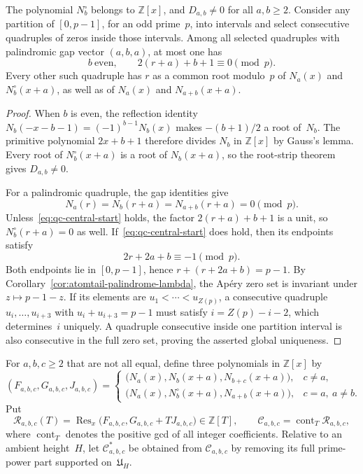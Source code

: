\begin{lemma}\label{lem:qc-deflation}
The polynomial $N_b^\circ$ belongs to $\mathbb Z[x]$, and
$D_{a,b}\ne0$ for all $a,b\ge2$.  Consider any partition of
$[0,p-1]$, for an odd prime~$p$, into intervals and select
consecutive quadruples of zeros
inside those intervals.  Among all selected quadruples with
palindromic gap vector $(a,b,a)$, at most one has
\begin{equation}\label{eq:qc-central-start}
 b\ \text{even},\qquad 2(r+a)+b+1\equiv0\pmod p.
\end{equation}
Every other such quadruple has $r$ as a common root modulo~$p$ of
$N_a(x)$ and $N_b^\circ(x+a)$, as well as of $N_a(x)$ and
$N_{a+b}(x+a)$.
\end{lemma}

\begin{proof}
When $b$ is even, the reflection identity
$N_b(-x-b-1)=(-1)^{b-1}N_b(x)$ makes
$-(b+1)/2$ a root of~$N_b$.  The primitive polynomial
$2x+b+1$ therefore divides $N_b$ in $\mathbb Z[x]$ by Gauss's
lemma.  Every root of $N_b^\circ(x+a)$ is a root of
$N_b(x+a)$, so the root-strip theorem gives $D_{a,b}\ne0$.

For a palindromic quadruple, the gap identities give
\[
 N_a(r)=N_b(r+a)=N_{a+b}(r+a)=0\pmod p.
\]
Unless~\eqref{eq:qc-central-start} holds, the factor
$2(r+a)+b+1$ is a unit, so $N_b^\circ(r+a)=0$ as well.
If~\eqref{eq:qc-central-start} does hold, then its endpoints satisfy
\[
 2r+2a+b\equiv-1\pmod p.
\]
Both endpoints lie in $[0,p-1]$, hence
$r+(r+2a+b)=p-1$.  By
Corollary~\ref{cor:atomtail-palindrome-lambda}, the Ap\'ery zero set is
invariant under $z\mapsto p-1-z$.  If its elements are
$u_1<\cdots<u_{Z(p)}$, a consecutive quadruple
$u_i,\ldots,u_{i+3}$ with $u_i+u_{i+3}=p-1$ must satisfy
$i=Z(p)-i-2$, which determines~$i$ uniquely.  A quadruple
consecutive inside one partition interval is also consecutive in the
full zero set, proving the asserted global uniqueness.
\end{proof}

\begin{definition}\label{def:qc-aligned}
For $a,b,c\ge2$ that are not all equal, define three
polynomials in $\mathbb Z[x]$ by
\[
 (F_{a,b,c},G_{a,b,c},J_{a,b,c})=
 \begin{cases}
 \bigl(N_a(x),N_b(x+a),N_{b+c}(x+a)\bigr),&c\ne a,\\
 \bigl(N_a(x),N_b^\circ(x+a),N_{a+b}(x+a)\bigr),
     &c=a,\ a\ne b.
 \end{cases}
\]
Put
\[
 \mathcal R_{a,b,c}(T)
  =\operatorname{Res}_x\bigl(F_{a,b,c},G_{a,b,c}+T J_{a,b,c}\bigr)
  \in\mathbb Z[T],
 \qquad
 \mathcal C_{a,b,c}=\operatorname{cont}_T\mathcal R_{a,b,c},
\]
where $\operatorname{cont}_T$ denotes the positive gcd of all integer
coefficients.  Relative to an ambient height~$H$, let
$\mathcal C^*_{a,b,c}$ be obtained from $\mathcal C_{a,b,c}$ by
removing its full prime-power part supported on~$\mathfrak U_H$.
\end{definition}


